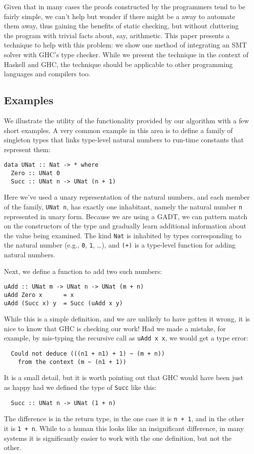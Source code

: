 \documentclass{sigplanconf}
\begin{document}
Given that in many cases the proofs constructed by the programmers
tend to be fairly simple, we can't help but wonder if there might
be a away to automate them away, thus gaining the benefits of
static checking, but without cluttering the program with trivial
facts about, say, arithmetic.  This paper presents a technique
to help with this problem: we show one method of integrating
an SMT solver with GHC's type checker.  While we present
the technique in the context of Haskell and GHC, the technique
should be applicable to other programming languages and compilers too.

\subsection{Examples}

We illustrate the utility of the functionality provided by our
algorithm with a few short examples.  A very common example in
this area is to define a family of singleton types that links
type-level natural numbers to run-time constants that represent
them:
\begin{Verbatim}
data UNat :: Nat -> * where
  Zero :: UNat 0
  Succ :: UNat n -> UNat (n + 1)
\end{Verbatim}
Here we've used a unary representation of the natural numbers,
and each member of the family, \Verb"UNat n", has exactly one
inhabitant, namely the natural number \Verb"n" represented in
unary form.  Because we are using a GADT, we can pattern match
on the constructors of the type and gradually learn additional
information about the value being examined.  The kind \Verb"Nat"
is inhabited by types corresponding to the natural number
(e.g., \Verb"0", \Verb"1", \dots), and \Verb"(+)" is a type-level
function for adding natural numbers.

Next, we define a function to add two such numbers:
\begin{Verbatim}
uAdd :: UNat m -> UNat n -> UNat (m + n)
uAdd Zero x      = x
uAdd (Succ x) y  = Succ (uAdd x y)
\end{Verbatim}
While this is a simple definition, and we are unlikely
to have gotten it wrong, it is nice to know that GHC
is checking our work!  Had we made a mistake, for
example, by mis-typing the recursive call as \Verb"uAdd x x",
we would get a type error:
\begin{Verbatim}
  Could not deduce (((n1 + n1) + 1) ~ (m + n))
    from the context (m ~ (n1 + 1))
\end{Verbatim}
It is a small detail, but it is worth pointing out that
GHC would have been just as happy had we defined the type
of \Verb"Succ" like this:
\begin{Verbatim}
  Succ :: UNat n -> UNat (1 + n)
\end{Verbatim}
The difference is in the return type, in the one case it is
\Verb"n + 1", and in the other it is \Verb"1 + n".  While
to a human this looks like an insignificant difference,
in many systems it is significantly easier to work
with the one definition, but not the other.
\end{document}
